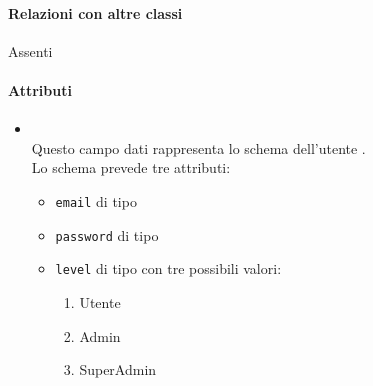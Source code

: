\paragraph*{Relazioni con altre classi}
Assenti

\paragraph*{Attributi}
\begin{itemize}
\item[]  \\ Questo campo dati rappresenta lo schema  dell'utente . \\
Lo schema prevede tre attributi:
\begin{itemize}
\item[]  \texttt{email} di tipo 
\item[]  \texttt{password} di tipo 
\item[]  \texttt{level} di tipo  con tre possibili valori: 
\begin{enumerate}
\item Utente
\item Admin
\item SuperAdmin
\end{enumerate}
\end{itemize}

\end{itemize}

